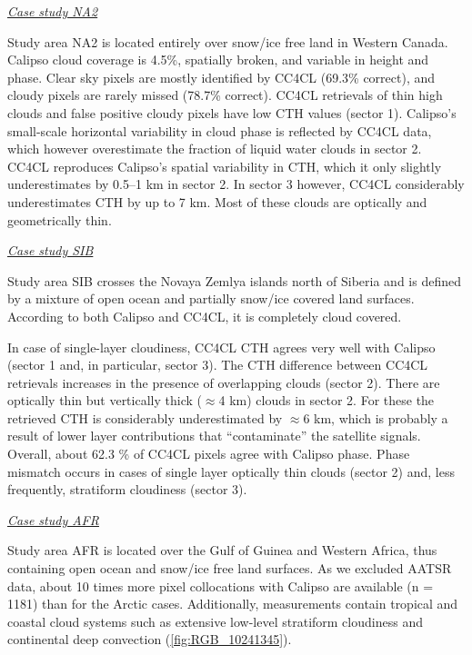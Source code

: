 \vspace{5mm}\underline{\textit{Case study NA2}}\vspace{2mm}

Study area NA2 is located entirely over snow/ice free land in Western Canada. Calipso cloud coverage is 4.5\%, spatially broken, and variable in height and phase. Clear sky pixels are mostly identified by CC4CL (69.3\% correct), and cloudy pixels are rarely missed (78.7\% correct). CC4CL retrievals of thin high clouds and false positive cloudy pixels have low CTH values (sector 1). Calipso's small-scale horizontal variability in cloud phase is reflected by CC4CL data, which however overestimate the fraction of liquid water clouds in sector 2. CC4CL reproduces Calipso's spatial variability in CTH, which it only slightly underestimates by 0.5--1 km in sector 2. In sector 3 however, CC4CL considerably underestimates CTH by up to 7 km. Most of these clouds are optically and geometrically thin.

\vspace{5mm}\underline{\textit{Case study SIB}}\vspace{2mm}

Study area SIB crosses the Novaya Zemlya islands north of Siberia and is defined by a mixture of open ocean and partially snow/ice covered land surfaces. According to both Calipso and CC4CL, it is completely cloud covered. 

In case of single-layer cloudiness, CC4CL CTH agrees very well with Calipso (sector 1 and, in particular, sector 3). The CTH difference between CC4CL retrievals increases in the presence of overlapping clouds (sector 2). There are optically thin but vertically thick ($\approx$4 km) clouds in sector 2. For these the retrieved CTH is considerably underestimated by $\approx$6 km, which is probably a result of lower layer contributions that ``contaminate'' the satellite signals. Overall, about 62.3 \% of CC4CL pixels agree with Calipso phase. Phase mismatch occurs in cases of single layer optically thin clouds (sector 2) and, less frequently, stratiform cloudiness (sector 3).

\vspace{5mm}\underline{\textit{Case study AFR}}\vspace{2mm}

Study area AFR is located over the Gulf of Guinea and Western Africa, thus containing open ocean and snow/ice free land surfaces. As we excluded AATSR data, about 10 times more pixel collocations with Calipso are available (n = 1181) than for the Arctic cases. Additionally, measurements contain tropical and coastal cloud systems such as extensive low-level stratiform cloudiness and continental deep convection (\cref{fig:RGB_10241345}).

